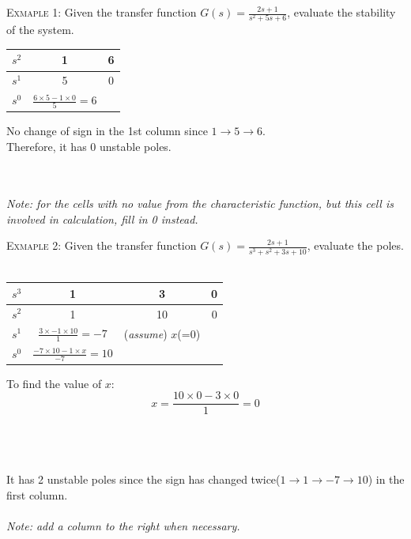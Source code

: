 \documentclass[12pt,a4paper]{article}
\begin{document}
\begin{tcolorbox}[breakable]
\textsc{Exmaple 1:} 
Given the transfer function $G(s) = \frac{2s+1}{s^{2}+5s+6}$, evaluate the stability of the system.\\
\begin{minipage}{0.3\textwidth}
 \begin{table}[H]
 \begin{tabular}{c|c|c}
 $s^{2}$&1&6\\ \hline
 $s^{1}$&5&0\\ \hline \hline
 $s^{0}$&$\frac{6\times 5 -1\times 0}{5}=6$&\\ 
 \end{tabular}
 \end{table}
 \end{minipage} \hfill
 \begin{minipage}{0.7\textwidth}
 No change of sign in the 1st column since $1\to 5\to 6$. \\ Therefore, it has 0 unstable poles.
 \end{minipage} \ \\ \\
 \textit{Note: for the cells with no value from the characteristic function, but this cell is involved in calculation, fill in 0 instead.}
\end{tcolorbox}

\begin{tcolorbox}[breakable]
\textsc{Exmaple 2:} 
Given the transfer function $G(s) = \frac{2s+1}{s^{3}+s^{2}+3s+10}$, evaluate the poles.\\\\
\begin{minipage}{0.5\textwidth}
 \begin{table}[H]
 \begin{tabular}{c|c|c|c}
 $s^{3}$&1&3&0\\ \hline
 $s^{2}$&1&10&0\\ \hline \hline
 $s^{1}$&$\frac{3\times -1\times 10}{1}=-7$&(\textit{assume}) $x$(=0)& \\ \hline 
 $s^{0}$&$\frac{-7\times 10 -1\times x}{-7}=10$&&\\ 
 \end{tabular}
 \end{table}
 \end{minipage} \hfill
 \begin{minipage}{0.4\textwidth}
 To find the value of $x$:
 \[x = \frac{10\times0-3\times0}{1}=0\]
 \end{minipage}\\\\\\
  It has 2 unstable poles since the sign has changed twice($1\to 1\to -7 \to 10$) in the first column.
  \ \\ \\
 \textit{Note: add a column to the right when necessary.}
\end{tcolorbox}
\end{document}
